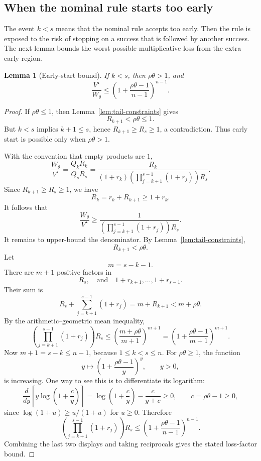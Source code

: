 \documentclass[11pt,a4paper]{article}
\newtheorem{lemma}{Lemma}
\begin{document}
\subsection{When the nominal rule starts too early}

The event \(k<s\) means that the nominal rule accepts too early.  Then the
rule is exposed to the risk of stopping on a success that is followed by another
success.  The next lemma bounds the worst possible multiplicative loss from the
extra early region.

\begin{lemma}[Early-start bound]
\label{lem:early}
If \(k<s\), then \(\rho\theta>1\), and
\[
  \frac{V^\star}{W_\theta}
  \le
  \left(1+\frac{\rho\theta-1}{n-1}\right)^{n-1}.
\]
\end{lemma}

\begin{proof}
If \(\rho\theta\le1\), then Lemma~\ref{lem:tail-constraints} gives
\[
  R_{k+1}<\rho\theta\le1.
\]
But \(k<s\) implies \(k+1\le s\), hence \(R_{k+1}\ge R_s\ge1\), a
contradiction.  Thus early start is possible only when \(\rho\theta>1\).

With the convention that empty products are \(1\),
\[
  \frac{W_\theta}{V^\star}
  =
  \frac{Q_kR_k}{Q_sR_s}
  =
  \frac{R_k}
  {(1+r_k)\left(\prod_{j=k+1}^{s-1}(1+r_j)\right)R_s}.
\]
Since \(R_{k+1}\ge R_s\ge1\), we have
\[
  R_k=r_k+R_{k+1}\ge1+r_k.
\]
It follows that
\[
  \frac{W_\theta}{V^\star}
  \ge
  \frac1{\left(\prod_{j=k+1}^{s-1}(1+r_j)\right)R_s}.
\]
It remains to upper-bound the denominator.  By Lemma~\ref{lem:tail-constraints},
\[
  R_{k+1}<\rho\theta.
\]
Let
\[
  m=s-k-1.
\]
There are \(m+1\) positive factors in
\[
  R_s,
  \quad\text{and}\quad
  1+r_{k+1},\dots,1+r_{s-1}.
\]
Their sum is
\[
  R_s+\sum_{j=k+1}^{s-1}(1+r_j)
  =
  m+R_{k+1}
  <
  m+\rho\theta.
\]
By the arithmetic--geometric mean inequality,
\[
  \left(\prod_{j=k+1}^{s-1}(1+r_j)\right)R_s
  \le
  \left(\frac{m+\rho\theta}{m+1}\right)^{m+1}
  =
  \left(1+\frac{\rho\theta-1}{m+1}\right)^{m+1}.
\]
Now \(m+1=s-k\le n-1\), because \(1\le k<s\le n\).  For
\(\rho\theta\ge1\), the function
\[
  y\longmapsto \left(1+\frac{\rho\theta-1}{y}\right)^y,
  \qquad y>0,
\]
is increasing.  One way to see this is to differentiate its logarithm:
\[
  \frac{d}{dy}\left[y\log\left(1+\frac{c}{y}\right)\right]
  =
  \log\left(1+\frac{c}{y}\right)-\frac{c}{y+c}\ge0,
  \qquad c=\rho\theta-1\ge0,
\]
since \(\log(1+u)\ge u/(1+u)\) for \(u\ge0\).  Therefore
\[
  \left(\prod_{j=k+1}^{s-1}(1+r_j)\right)R_s
  \le
  \left(1+\frac{\rho\theta-1}{n-1}\right)^{n-1}.
\]
Combining the last two displays and taking reciprocals gives the stated
loss-factor bound.
\end{proof}
\end{document}
